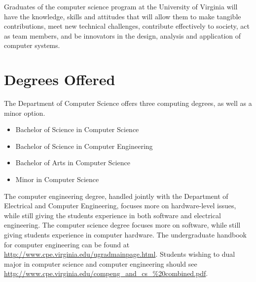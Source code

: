 \documentclass[12pt,twoside]{article}
\newenvironment{itemlist}{
\begin{itemize}
\setlength{\itemsep}{0pt}
\setlength{\parskip}{0pt}}
{\end{itemize}}
\begin{document}
Graduates of the computer science program at the University of
Virginia will have the knowledge, skills and attitudes that will allow
them to make tangible contributions, meet new technical challenges,
contribute effectively to society, act as team members, and be
innovators in the design, analysis and application of computer
systems.





\section{Degrees Offered}

The Department of Computer Science offers three computing degrees, as
well as a minor option.

\begin{itemlist}
\item Bachelor of Science in Computer Science
\item Bachelor of Science in Computer Engineering
\item Bachelor of Arts in Computer Science
\item Minor in Computer Science
\end{itemlist}

The computer engineering degree, handled jointly with the Department
of Electrical and Computer Engineering, focuses more on hardware-level
issues, while still giving the students experience in both software
and electrical engineering.  The computer science degree focuses more
on software, while still giving students experience in computer
hardware.  The undergraduate handbook for computer engineering can be
found at
\url{http://www.cpe.virginia.edu/ugradmainpage.html}.
Students wishing to dual major in computer science and computer
engineering should see
\url{http://www.cpe.virginia.edu/compeng_and_cs_%20combined.pdf}.
\end{document}
